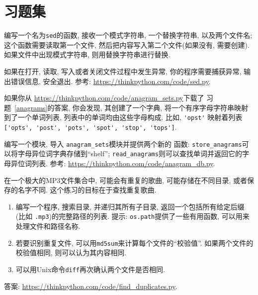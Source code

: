 \documentclass[10pt]{book}
\begin{document}
\section{习题集}

\begin{exercise}

编写一个名为{\tt sed}的函数, 接收一个模式字符串, 一个替换字符串, 以及两个文件名;
这个函数需要读取第一个文件, 然后把内容写入第二个文件(如果没有, 需要创建).
如果文件中出现模式字符串, 则用替换字符串进行替换. 

如果在打开, 读取, 写入或者关闭文件过程中发生异常, 
你的程序需要捕获异常, 输出错误信息, 安全退出. 
参考: \url{https://thinkpython.com/code/sed.py}.

\end{exercise}


\begin{exercise}

如果你从 \url{https://thinkpython.com/code/anagram_sets.py}下载了
习题~\ref{anagrams}的答案, 你会发现, 
其创建了一个字典, 将一个有序字母字符串映射到了一个单词列表, 
列表中的单词均由这些字母构成. 比如,
\verb"'opst'" 映射着列表
\verb"['opts', 'post', 'pots', 'spot', 'stop', 'tops']".

编写一个模块, 导入 \verb"anagram_sets"模块并提供两个新的
函数: \verb"store_anagrams"可以将字母异位词字典存储到``shelf''; 
\verb"read_anagrams"则可以查找单词并返回它的字母异位词列表. 
参考: \url{https://thinkpython.com/code/anagram_db.py}.

\end{exercise}


\begin{exercise}
\label{checksum}

在一个极大的MP3文件集合中, 可能会有重复的歌曲, 可能存储在不同目录, 
或者保存的名字不同. 
这个练习的目标在于查找重复歌曲. 

\begin{enumerate}

\item 编写一个程序, 搜索目录, 并递归其所有子目录, 
返回一个包括所有给定后缀 (比如 {\tt .mp3})的完整路径的列表. 
提示: {\tt os.path}提供了一些有用函数, 可以用来处理文件和路径名称. 

\item 若要识别重复文件, 可以用{\tt md5sum}来计算每个文件的``校验值''. 
如果两个文件的校验值相同, 则可以认为其内容相同. 

\item 可以用Unix命令{\tt diff}再次确认两个文件是否相同. 

\end{enumerate}

答案: \url{https://thinkpython.com/code/find_duplicates.py}.

\end{exercise}
\end{document}
